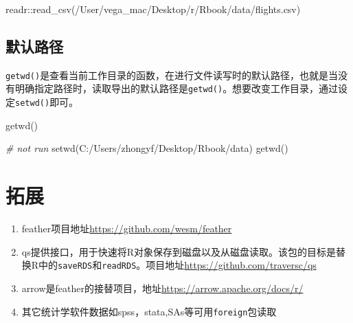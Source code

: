 \documentclass[
]{book}
\newenvironment{Shaded}{\begin{snugshade}}{\end{snugshade}}
\newcommand{\CommentTok}[1]{\textcolor[rgb]{0.56,0.35,0.01}{\textit{#1}}}
\newcommand{\FunctionTok}[1]{\textcolor[rgb]{0.00,0.00,0.00}{#1}}
\newcommand{\NormalTok}[1]{#1}
\newcommand{\SpecialCharTok}[1]{\textcolor[rgb]{0.00,0.00,0.00}{#1}}
\newcommand{\StringTok}[1]{\textcolor[rgb]{0.31,0.60,0.02}{#1}}
\begin{document}
\begin{Shaded}
\begin{Highlighting}[]
\NormalTok{readr}\SpecialCharTok{::}\FunctionTok{read\_csv}\NormalTok{(}\StringTok{\textquotesingle{}/User/vega\_mac/Desktop/r/Rbook/data/flights.csv\textquotesingle{}}\NormalTok{)}
\end{Highlighting}
\end{Shaded}

\hypertarget{ux9ed8ux8ba4ux8defux5f84}{%
\subsection{默认路径}\label{ux9ed8ux8ba4ux8defux5f84}}

\texttt{getwd()}是查看当前工作目录的函数，在进行文件读写时的默认路径，也就是当没有明确指定路径时，读取导出的默认路径是\texttt{getwd()}。想要改变工作目录，通过设定\texttt{setwd()}即可。

\begin{Shaded}
\begin{Highlighting}[]
\FunctionTok{getwd}\NormalTok{()}
\end{Highlighting}
\end{Shaded}

\begin{Shaded}
\begin{Highlighting}[]
\CommentTok{\# not run}
\FunctionTok{setwd}\NormalTok{(}\StringTok{\textquotesingle{}C:/Users/zhongyf/Desktop/Rbook/data\textquotesingle{}}\NormalTok{)}
\FunctionTok{getwd}\NormalTok{()}
\end{Highlighting}
\end{Shaded}

\hypertarget{data:expand}{%
\section{拓展}\label{data:expand}}

\begin{enumerate}
\def\labelenumi{\arabic{enumi}.}
\item
  feather项目地址\url{https://github.com/wesm/feather}
\item
  qs提供接口，用于快速将R对象保存到磁盘以及从磁盘读取。该包的目标是替换R中的\texttt{saveRDS}和\texttt{readRDS}。项目地址\url{https://github.com/traversc/qs}
\item
  arrow是feather的接替项目，地址\url{https://arrow.apache.org/docs/r/}
\item
  其它统计学软件数据如spss，stata,SAs等可用\texttt{foreign}包读取
\end{enumerate}
\end{document}
